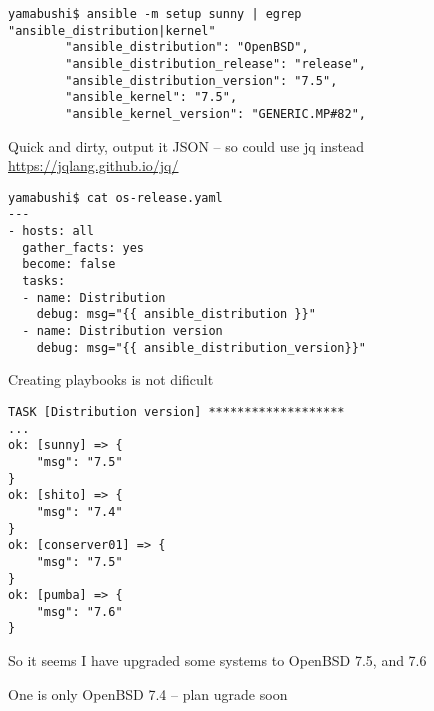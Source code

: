 \documentclass[Screen16to9,17pt]{foils}
\begin{document}

\begin{verbatim}
yamabushi$ ansible -m setup sunny | egrep "ansible_distribution|kernel"
        "ansible_distribution": "OpenBSD",
        "ansible_distribution_release": "release",
        "ansible_distribution_version": "7.5",
        "ansible_kernel": "7.5",
        "ansible_kernel_version": "GENERIC.MP#82",
\end{verbatim}

\begin{list2}
\item Quick and dirty, output it JSON -- so could use jq instead \url{https://jqlang.github.io/jq/}
\end{list2}


\begin{verbatim}
yamabushi$ cat os-release.yaml
---
- hosts: all
  gather_facts: yes
  become: false
  tasks:
  - name: Distribution
    debug: msg="{{ ansible_distribution }}"
  - name: Distribution version
    debug: msg="{{ ansible_distribution_version}}"
\end{verbatim}

\begin{list2}
\item Creating playbooks is not dificult
\end{list2}



\begin{verbatim}
TASK [Distribution version] *******************
...
ok: [sunny] => {
    "msg": "7.5"
}
ok: [shito] => {
    "msg": "7.4"
}
ok: [conserver01] => {
    "msg": "7.5"
}
ok: [pumba] => {
    "msg": "7.6"
}
\end{verbatim}

\begin{list2}
\item So it seems I have upgraded some systems to OpenBSD 7.5, and 7.6
\item One is only OpenBSD 7.4 -- plan ugrade soon
\end{list2}



\end{document}
